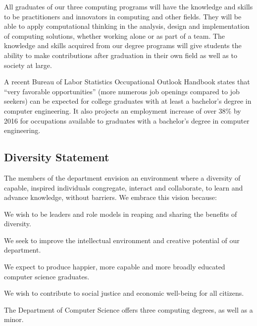 All graduates of our three computing programs will have the knowledge
and skills to be practitioners and innovators in computing and other
fields.  They will be able to apply computational thinking in the
analysis, design and implementation of computing solutions, whether
working alone or as part of a team. The knowledge and skills acquired
from our degree programs will give students the ability to make
contributions after graduation in their own field as well as to
society at large.

A recent Bureau of Labor Statistics Occupational Outlook Handbook
states that ``very favorable opportunities'' (more numerous job
openings compared to job seekers) can be expected for college
graduates with at least a bachelor's degree in computer
engineering. It also projects an employment increase of over 38\% by
2016 for occupations available to graduates with a bachelor's degree
in computer engineering.

\subsection{Diversity Statement}

The members of the department envision an environment where a
diversity of capable, inspired individuals congregate, interact and
collaborate, to learn and advance knowledge, without barriers. We
embrace this vision because:

\begin{itemlist}
\item We wish to be leaders and role models in reaping and sharing the
 benefits of diversity.
\item We seek to improve the intellectual environment and creative
 potential of our department.
\item We expect to produce happier, more capable and more broadly
 educated computer science graduates.
\item We wish to contribute to social justice and economic well-being
 for all citizens.
\end{itemlist}


The Department of Computer Science offers three computing degrees, as well as a minor.

